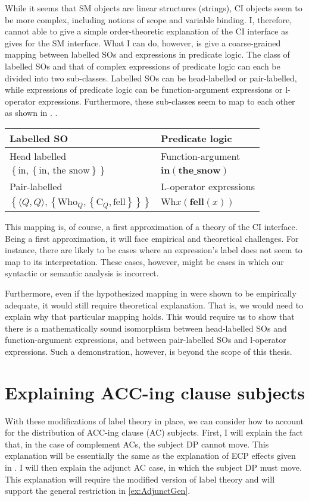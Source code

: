 \documentclass[MilwayThesis]{subfiles}
\begin{document}
While it seems that SM objects are linear structures (strings), CI objects seem to be more complex, including notions of scope and variable binding.
I, therefore, cannot able to give a simple order-theoretic explanation of the CI interface as \textcite{kayne1994antisymmetry} gives for the SM interface.
What I can do, however, is give a coarse-grained mapping between labelled SOs and expressions in predicate logic.
The class of labelled SOs and that of complex expressions of predicate logic can each be divided into two sub-classes.
Labelled SOs can be head-labelled or pair-labelled, while expressions of predicate logic can be function-argument expressions or l-operator expressions.
Furthermore, these sub-classes seem to map to each other as shown in \Next.
\ex.
\begin{tabular}[t]{ll}
	Labelled SO & Predicate logic\\
	\hline
	\hline
	Head labelled & Function-argument\\
	$\left\{ \text{in}, \left\{ \text{in, the snow} \right\} \right\}$ & $\textbf{in}(\textbf{the\_snow})$\\
	\hline
	Pair-labelled & L-operator expressions\\
	$\left\{ \langle Q,Q\rangle, \left\{\text{Who}_Q, \left\{\text{C}_Q, \text{fell} \right\}  \right\} \right\}$ & $\text{Wh}x(\textbf{fell}(x))$\\
	\hline
\end{tabular}

This mapping is, of course, a first approximation of a theory of the CI interface.
Being a first approximation, it will face empirical and theoretical challenges.
For instance, there are likely to be cases where an expression's label does not seem to map to its interpretation.
These cases, however, might be cases in which our syntactic or semantic analysis is incorrect.

Furthermore, even if the hypothesized mapping in \Last were shown to be empirically adequate, it would still require theoretical explanation.
That is, we would need to explain why that particular mapping holds.
This would require us to show that there is a mathematically sound isomorphism between head-labelled SOs and function-argument expressions, and between pair-labelled SOs and l-operator expressions.
Such a demonstration, however, is beyond the scope of this thesis.
\section{Explaining ACC-ing clause subjects}\label{sec:ExplainingACCingSubjs}
With these modifications of label theory in place, we can consider how to account for the distribution of ACC-ing clause (AC) subjects.
First, I will explain the fact that, in the case of complement ACs, the subject DP cannot move.
This explanation will be essentially the same as the explanation of ECP effects given in \cite{chomsky2015problems}.
I will then explain the adjunct AC case, in which the subject DP must move.
This explanation will require the modified version of label theory and will support the general restriction in \cref{ex:AdjunctGen}.
\end{document}
